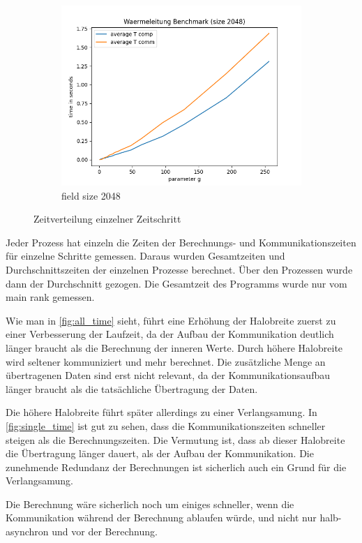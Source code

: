 \documentclass[12pt]{article}
\begin{document}
\begin{figure}[!htb]
\begin{center}
\begin{subfigure}{0.5\textwidth}
            \includegraphics[scale=0.5]{../benchmark/plots/plot_avg_2048.png}
            \caption{field size 2048}\label{fig:plot_2048_avg}
        \end{subfigure}
    \end{center}
	\caption{Zeitverteilung einzelner Zeitschritt}
    \label{fig:single_time}
\end{figure}

Jeder Prozess hat einzeln die Zeiten der Berechnungs- und Kommunikationszeiten für einzelne Schritte gemessen. Daraus wurden Gesamtzeiten und Durchschnittszeiten der einzelnen Prozesse berechnet. Über den Prozessen wurde dann der Durchschnitt gezogen.
Die Gesamtzeit des Programms wurde nur vom main rank gemessen.

Wie man in \autoref{fig:all_time} sieht, führt eine Erhöhung der Halobreite zuerst zu einer Verbesserung der Laufzeit, da der Aufbau der Kommunikation deutlich länger braucht als die Berechnung der inneren Werte. 
Durch höhere Halobreite wird seltener kommuniziert und mehr berechnet. 
Die zusätzliche Menge an übertragenen Daten sind erst nicht relevant, da der Kommunikationsaufbau länger braucht als die tatsächliche Übertragung der Daten.

Die höhere Halobreite führt später allerdings zu einer Verlangsamung.
In \autoref{fig:single_time} ist gut zu sehen, dass die Kommunikationszeiten schneller steigen als die Berechnungszeiten.
Die Vermutung ist, dass ab dieser Halobreite die Übertragung länger dauert, als der Aufbau der Kommunikation.
Die zunehmende Redundanz der Berechnungen ist sicherlich auch ein Grund für die Verlangsamung.

Die Berechnung wäre sicherlich noch um einiges schneller, wenn die Kommunikation während der Berechnung ablaufen würde, und nicht nur halb-asynchron und vor der Berechnung.
\FloatBarrier

\typeout{}
\clearpage
\pagestyle{empty}

% 
\end{document}
